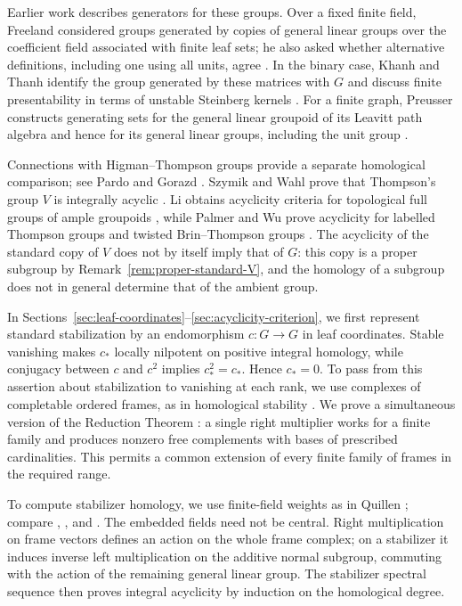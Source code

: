 \documentclass[11pt]{amsart}
\theoremstyle{definition}
\theoremstyle{remark}
\numberwithin{equation}{section}
\begin{document}
Earlier work describes generators for these groups. Over a fixed finite field, Freeland considered groups generated by copies of general linear groups over the coefficient field associated with finite leaf sets; he also asked whether alternative definitions, including one using all units, agree \cite[Definitions~4.3.9--4.3.10 and pp.~173--174]{Freeland19}. In the binary case, Khanh and Thanh identify the group generated by these matrices with $G$ and discuss finite presentability in terms of unstable Steinberg kernels \cite[Theorem~4.3 and \S8]{KT26}. For a finite graph, Preusser constructs generating sets for the general linear groupoid of its Leavitt path algebra and hence for its general linear groups, including the unit group \cite[Theorem~4.13]{Preusser26}.

Connections with Higman--Thompson groups provide a separate homological comparison; see Pardo \cite{Pardo11} and Gorazd \cite{Gorazd26}. Szymik and Wahl prove that Thompson's group $V$ is integrally acyclic \cite{SW19}. Li obtains acyclicity criteria for topological full groups of ample groupoids \cite[Corollary~D]{Li25}, while Palmer and Wu prove acyclicity for labelled Thompson groups and twisted Brin--Thompson groups \cite[Theorems~A and~C]{PW25}. The acyclicity of the standard copy of $V$ does not by itself imply that of $G$: this copy is a proper subgroup by Remark~\ref{rem:proper-standard-V}, and the homology of a subgroup does not in general determine that of the ambient group.

In Sections~\ref{sec:leaf-coordinates}--\ref{sec:acyclicity-criterion}, we first represent standard stabilization by an endomorphism $c:G\to G$ in leaf coordinates. Stable vanishing makes $c_*$ locally nilpotent on positive integral homology, while conjugacy between $c$ and $c^2$ implies $c_*^2=c_*$. Hence $c_*=0$. To pass from this assertion about stabilization to vanishing at each rank, we use complexes of completable ordered frames, as in homological stability \cite{vdK80,Suslin84,NS90,RWW17}. We prove a simultaneous version of the Reduction Theorem \cite[Theorem~2.2.11]{AAS17}: a single right multiplier works for a finite family and produces nonzero free complements with bases of prescribed cardinalities. This permits a common extension of every finite family of frames in the required range.

To compute stabilizer homology, we use finite-field weights as in Quillen \cite[\S11, Lemmas~15--16]{Quillen72}; compare \cite[Proposition~2.1 and Theorem~3.1]{Knudson02}, \cite[Proposition~1.10 and Theorem~1.11]{NS90}, and \cite[\S2]{Schlichting17}. The embedded fields need not be central. Right multiplication on frame vectors defines an action on the whole frame complex; on a stabilizer it induces inverse left multiplication on the additive normal subgroup, commuting with the action of the remaining general linear group. The stabilizer spectral sequence then proves integral acyclicity by induction on the homological degree.
\end{document}
